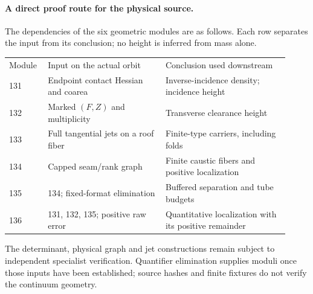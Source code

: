 \paragraph{A direct proof route for the physical source.}
The dependencies of the six geometric modules are as follows. Each row
separates the input from its conclusion; no height is inferred from mass alone.
\begin{center}
\begin{tabular}{@{}p{0.12\linewidth}p{0.39\linewidth}p{0.41\linewidth}@{}}
Module & Input on the actual orbit & Conclusion used downstream\\[3pt]
131 & Endpoint contact Hessian and coarea & Inverse-incidence density; incidence height\\
132 & Marked $(F,Z)$ and multiplicity & Transverse clearance height\\
133 & Full tangential jets on a roof fiber & Finite-type carriers, including folds\\
134 & Capped seam/rank graph & Finite caustic fibers and positive localization\\
135 & 134; fixed-format elimination & Buffered separation and tube budgets\\
136 & 131, 132, 135; positive raw error & Quantitative localization with its positive remainder
\end{tabular}
\end{center}
The determinant, physical graph and jet constructions remain subject
to independent specialist verification. Quantifier elimination supplies
moduli once those inputs have been established; source hashes and
finite fixtures do not verify the continuum geometry.
